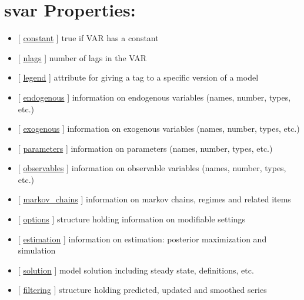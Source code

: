 \documentclass[letterpaper,10pt,english]{sphinxmanual}
\begin{document}
\section{svar Properties:}
\label{classes/models/@svar/svar:svar-properties}\begin{itemize}
\item {} 
{[} {\hyperref[classes/models/@svar/svar:constant]{constant}} {]}   true if VAR has a constant

\item {} 
{[} {\hyperref[classes/models/@svar/svar:nlags]{nlags}} {]}   number of lags in the VAR

\item {} 
{[} {\hyperref[classes/models/@svar/svar:legend]{legend}} {]}   attribute for giving a tag to a specific version of a model

\item {} 
{[} {\hyperref[classes/models/@svar/svar:endogenous]{endogenous}} {]}   information on endogenous variables (names, number, types, etc.)

\item {} 
{[} {\hyperref[classes/models/@svar/svar:exogenous]{exogenous}} {]}   information on exogenous variables (names, number, types, etc.)

\item {} 
{[} {\hyperref[classes/models/@svar/svar:parameters]{parameters}} {]}   information on parameters (names, number, types, etc.)

\item {} 
{[} {\hyperref[classes/models/@svar/svar:observables]{observables}} {]}   information on observable variables (names, number, types, etc.)

\item {} 
{[} {\hyperref[classes/models/@svar/svar:markov-chains]{markov\_chains}} {]}   information on markov chains, regimes and related items

\item {} 
{[} {\hyperref[classes/models/@svar/svar:options]{options}} {]}   structure holding information on modifiable settings

\item {} 
{[} {\hyperref[classes/models/@svar/svar:estimation]{estimation}} {]}   information on estimation: posterior maximization and simulation

\item {} 
{[} {\hyperref[classes/models/@svar/svar:solution]{solution}} {]}   model solution including steady state, definitions, etc.

\item {} 
{[} {\hyperref[classes/models/@svar/svar:filtering]{filtering}} {]}   structure holding predicted, updated and smoothed series

\end{itemize}
\end{document}
